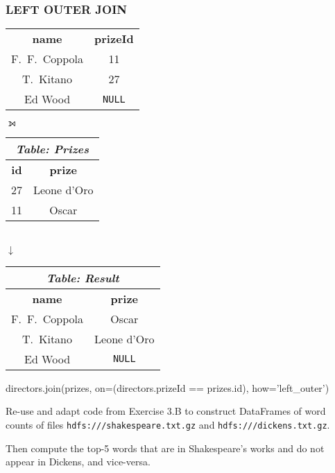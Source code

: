 \documentclass[english,serif,mathserif]{beamer}
\begin{document}
\begin{frame}[fragile]
  \frametitle{LEFT OUTER JOIN}

  \begin{center}
    \begin{tabular}{cc}
      \rowcolor{white}\multicolumn{2}{c}{\em Table: Directors}
      \\
      \hline
      \textbf{name} & \textbf{prizeId}
      \\
      \hline
      F.~F.~Coppola & 11
      \\
      T.~Kitano & 27
      \\
      Ed Wood & \texttt{NULL}
    \end{tabular}
    {\color{gray}$\pmb\leftouterjoin$}
    \begin{tabular}{cc}
      \multicolumn{2}{c}{\em Table: Prizes}
      \\
      \hline
      \textbf{id} & \textbf{prize}
      \\
      \hline
      27 & Leone d'Oro
      \\
      11 & Oscar
    \end{tabular}
    \\
    {\color{gray}$\pmb\downarrow$}
    \\
    \begin{tabular}{cc}
      \multicolumn{2}{c}{\em Table: Result}
      \\
      \hline
      \textbf{name} & \textbf{prize}
      \\
      \hline
      F.~F.~Coppola & Oscar
      \\
      T.~Kitano & Leone d'Oro
      \\
      Ed Wood & \texttt{NULL}
    \end{tabular}

    \+
    \begin{minipage}{32ex}
      \begin{python}
directors.join(prizes,
  on=(directors.prizeId == prizes.id),
  how='left_outer')
    \end{python}
  \end{minipage}
  \end{center}
\end{frame}


\begin{frame}
  \begin{exercise*}[4.A]
    Re-use and adapt code from Exercise 3.B to construct DataFrames of
    word counts of files \texttt{hdfs:///shakespeare.txt.gz} and
    \texttt{hdfs:///dickens.txt.gz}.

    Then compute the top-5 words that are in Shakespeare's works and do
    not appear in Dickens, and vice-versa.
  \end{exercise*}
\end{frame}
\end{document}
